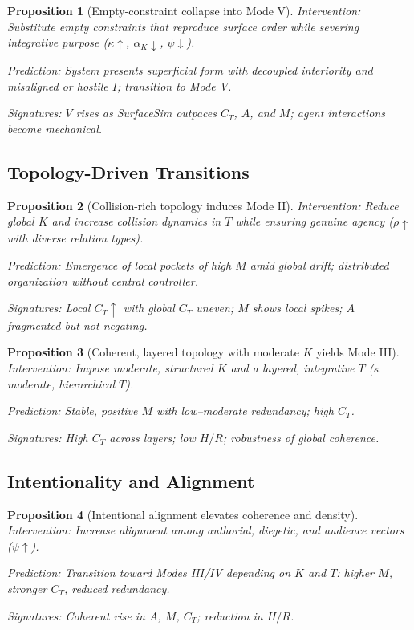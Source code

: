 \documentclass[12pt]{article}
\newtheorem{proposition}{Proposition}
\begin{document}
\begin{proposition}[Empty-constraint collapse into Mode V]
\label{prop:p2}
Intervention: Substitute empty constraints that reproduce surface order while severing integrative purpose ($\kappa \uparrow$, $\alpha_K \downarrow$, $\psi \downarrow$).

Prediction: System presents superficial form with decoupled interiority and misaligned or hostile $I$; transition to Mode V.

Signatures: $V$ rises as SurfaceSim outpaces $C_T$, $A$, and $M$; agent interactions become mechanical.
\end{proposition}

\subsection{Topology-Driven Transitions}

\begin{proposition}[Collision-rich topology induces Mode II]
\label{prop:p3}
Intervention: Reduce global $K$ and increase collision dynamics in $T$ while ensuring genuine agency ($\rho \uparrow$ with diverse relation types).

Prediction: Emergence of local pockets of high $M$ amid global drift; distributed organization without central controller.

Signatures: Local $C_T \uparrow$ with global $C_T$ uneven; $M$ shows local spikes; $A$ fragmented but not negating.
\end{proposition}

\begin{proposition}[Coherent, layered topology with moderate $K$ yields Mode III]
\label{prop:p4}
Intervention: Impose moderate, structured $K$ and a layered, integrative $T$ ($\kappa$ moderate, hierarchical $T$).

Prediction: Stable, positive $M$ with low–moderate redundancy; high $C_T$.

Signatures: High $C_T$ across layers; low $H/R$; robustness of global coherence.
\end{proposition}

\subsection{Intentionality and Alignment}

\begin{proposition}[Intentional alignment elevates coherence and density]
\label{prop:p5}
Intervention: Increase alignment among authorial, diegetic, and audience vectors ($\psi \uparrow$).

Prediction: Transition toward Modes III/IV depending on $K$ and $T$: higher $M$, stronger $C_T$, reduced redundancy.

Signatures: Coherent rise in $A$, $M$, $C_T$; reduction in $H/R$.
\end{proposition}
\end{document}
